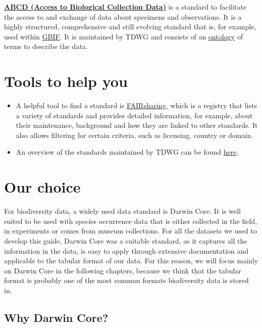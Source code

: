 \documentclass[
]{book}
\begin{document}
\href{https://abcd.tdwg.org/}{\textbf{ABCD (Access to Biological Collection Data)}} is a standard to facilitate the access to and exchange of data about specimens and observations. It is a highly structured, comprehensive and still evolving standard that is, for example, used within \protect\hyperlink{GBIF}{GBIF}. It is maintained by TDWG and consists of an \protect\hyperlink{ontology}{ontology} of terms to describe the data.

\hypertarget{tools-to-help-you-1}{%
\section{Tools to help you}\label{tools-to-help-you-1}}

\begin{itemize}
\item
  A helpful tool to find a standard is \href{https://fairsharing.org/search?fairsharingRegistry=Standard}{FAIRsharing}, which is a registry that lists a variety of standards and provides detailed information, for example, about their maintenance, background and how they are linked to other standards. It also allows filtering for certain criteria, such as licensing, country or domain.
\item
  An overview of the standards maintained by TDWG can be found \href{https://www.tdwg.org/standards/}{here}.
\end{itemize}

\hypertarget{our-choice-1}{%
\section{Our choice}\label{our-choice-1}}

For biodiversity data, a widely used data standard is Darwin Core. It is well suited to be used with species occurrence data that is either collected in the field, in experiments or comes from museum collections. For all the datasets we used to develop this guide, Darwin Core was a suitable standard, as it captures all the information in the data, is easy to apply through extensive documentation and applicable to the tabular format of our data. For this reason, we will focus mainly on Darwin Core in the following chapters, because we think that the tabular format is probably one of the most common formats biodiversity data is stored in.

\hypertarget{why-darwin-core}{%
\subsection{Why Darwin Core?}\label{why-darwin-core}}
\end{document}
